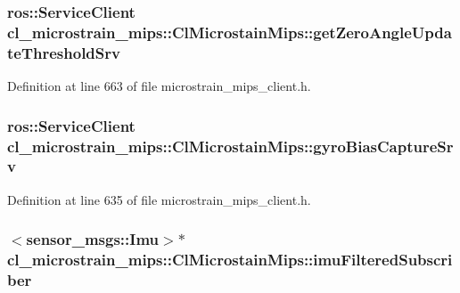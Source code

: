 \subsubsection[{\texorpdfstring{get\+Zero\+Angle\+Update\+Threshold\+Srv}{getZeroAngleUpdateThresholdSrv}}]{\setlength{\rightskip}{0pt plus 5cm}ros\+::\+Service\+Client cl\+\_\+microstrain\+\_\+mips\+::\+Cl\+Microstain\+Mips\+::get\+Zero\+Angle\+Update\+Threshold\+Srv\hspace{0.3cm}{\ttfamily [protected]}}\hypertarget{classcl__microstrain__mips_1_1ClMicrostainMips_ae720970f4114e7b6524b59df405ede83}{}\label{classcl__microstrain__mips_1_1ClMicrostainMips_ae720970f4114e7b6524b59df405ede83}


Definition at line 663 of file microstrain\+\_\+mips\+\_\+client.\+h.

\subsubsection[{\texorpdfstring{gyro\+Bias\+Capture\+Srv}{gyroBiasCaptureSrv}}]{\setlength{\rightskip}{0pt plus 5cm}ros\+::\+Service\+Client cl\+\_\+microstrain\+\_\+mips\+::\+Cl\+Microstain\+Mips\+::gyro\+Bias\+Capture\+Srv\hspace{0.3cm}{\ttfamily [protected]}}\hypertarget{classcl__microstrain__mips_1_1ClMicrostainMips_a584ea1089a89cd1039494d0fce19485c}{}\label{classcl__microstrain__mips_1_1ClMicrostainMips_a584ea1089a89cd1039494d0fce19485c}


Definition at line 635 of file microstrain\+\_\+mips\+\_\+client.\+h.

\subsubsection[{\texorpdfstring{imu\+Filtered\+Subscriber}{imuFilteredSubscriber}}]{$<$sensor\+\_\+msgs\+::\+Imu$>$$\ast$ cl\+\_\+microstrain\+\_\+mips\+::\+Cl\+Microstain\+Mips\+::imu\+Filtered\+Subscriber}\hypertarget{classcl__microstrain__mips_1_1ClMicrostainMips_ae53fdf79a14adb9c3eff4a8966a092ff}{}\label{classcl__microstrain__mips_1_1ClMicrostainMips_ae53fdf79a14adb9c3eff4a8966a092ff}


